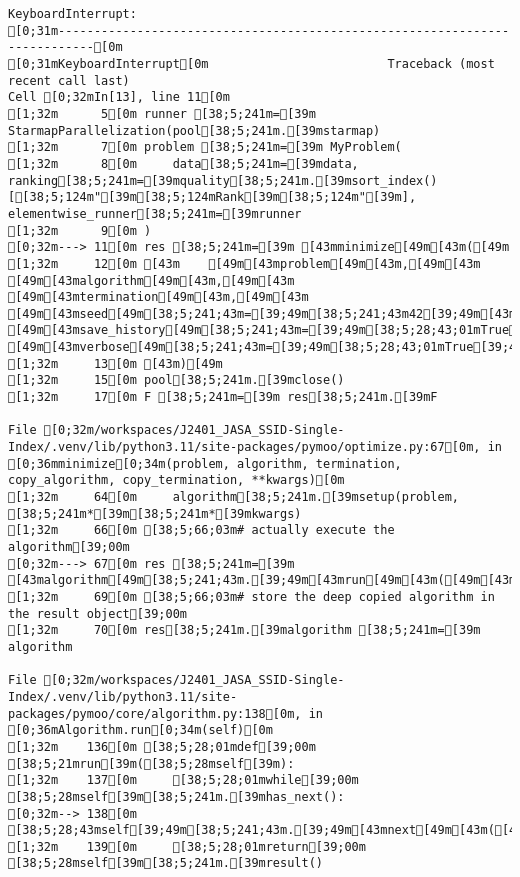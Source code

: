 \documentclass[
  letterpaper,
  DIV=11,
  numbers=noendperiod]{scrartcl}
\begin{document}
\begin{verbatim}
KeyboardInterrupt: 
[0;31m---------------------------------------------------------------------------[0m
[0;31mKeyboardInterrupt[0m                         Traceback (most recent call last)
Cell [0;32mIn[13], line 11[0m
[1;32m      5[0m runner [38;5;241m=[39m StarmapParallelization(pool[38;5;241m.[39mstarmap)
[1;32m      7[0m problem [38;5;241m=[39m MyProblem(
[1;32m      8[0m     data[38;5;241m=[39mdata, ranking[38;5;241m=[39mquality[38;5;241m.[39msort_index()[[38;5;124m"[39m[38;5;124mRank[39m[38;5;124m"[39m], elementwise_runner[38;5;241m=[39mrunner
[1;32m      9[0m )
[0;32m---> 11[0m res [38;5;241m=[39m [43mminimize[49m[43m([49m
[1;32m     12[0m [43m    [49m[43mproblem[49m[43m,[49m[43m [49m[43malgorithm[49m[43m,[49m[43m [49m[43mtermination[49m[43m,[49m[43m [49m[43mseed[49m[38;5;241;43m=[39;49m[38;5;241;43m42[39;49m[43m,[49m[43m [49m[43msave_history[49m[38;5;241;43m=[39;49m[38;5;28;43;01mTrue[39;49;00m[43m,[49m[43m [49m[43mverbose[49m[38;5;241;43m=[39;49m[38;5;28;43;01mTrue[39;49;00m
[1;32m     13[0m [43m)[49m
[1;32m     15[0m pool[38;5;241m.[39mclose()
[1;32m     17[0m F [38;5;241m=[39m res[38;5;241m.[39mF

File [0;32m/workspaces/J2401_JASA_SSID-Single-Index/.venv/lib/python3.11/site-packages/pymoo/optimize.py:67[0m, in [0;36mminimize[0;34m(problem, algorithm, termination, copy_algorithm, copy_termination, **kwargs)[0m
[1;32m     64[0m     algorithm[38;5;241m.[39msetup(problem, [38;5;241m*[39m[38;5;241m*[39mkwargs)
[1;32m     66[0m [38;5;66;03m# actually execute the algorithm[39;00m
[0;32m---> 67[0m res [38;5;241m=[39m [43malgorithm[49m[38;5;241;43m.[39;49m[43mrun[49m[43m([49m[43m)[49m
[1;32m     69[0m [38;5;66;03m# store the deep copied algorithm in the result object[39;00m
[1;32m     70[0m res[38;5;241m.[39malgorithm [38;5;241m=[39m algorithm

File [0;32m/workspaces/J2401_JASA_SSID-Single-Index/.venv/lib/python3.11/site-packages/pymoo/core/algorithm.py:138[0m, in [0;36mAlgorithm.run[0;34m(self)[0m
[1;32m    136[0m [38;5;28;01mdef[39;00m [38;5;21mrun[39m([38;5;28mself[39m):
[1;32m    137[0m     [38;5;28;01mwhile[39;00m [38;5;28mself[39m[38;5;241m.[39mhas_next():
[0;32m--> 138[0m         [38;5;28;43mself[39;49m[38;5;241;43m.[39;49m[43mnext[49m[43m([49m[43m)[49m
[1;32m    139[0m     [38;5;28;01mreturn[39;00m [38;5;28mself[39m[38;5;241m.[39mresult()


\end{verbatim}
\end{document}
